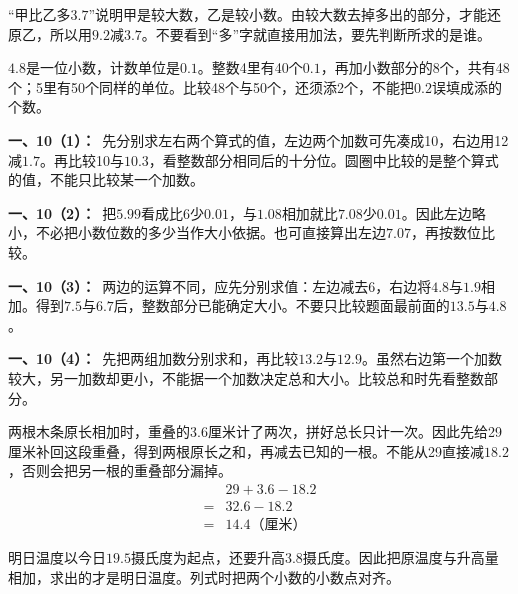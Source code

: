 \documentclass[multi=snippet,border=0pt]{standalone}
\newenvironment{snippet}[3]{\begin{minipage}{#1bp}\color{answerred}\fontsize{#2}{#3}\selectfont\raggedright}{\end{minipage}}
\begin{document}
\begin{snippet}{505}{11.5}{14}“甲比乙多\(3.7\)”说明甲是较大数，乙是较小数。由较大数去掉多出的部分，才能还原乙，所以用\(9.2\)减\(3.7\)。不要看到“多”字就直接用加法，要先判断所求的是谁。\end{snippet}
\begin{snippet}{505}{11.5}{14}\(4.8\)是一位小数，计数单位是\(0.1\)。整数4里有40个\(0.1\)，再加小数部分的8个，共有48个；5里有50个同样的单位。比较48个与50个，还须添2个，不能把\(0.2\)误填成添的个数。\end{snippet}
\begin{snippet}{505}{11.5}{14}\textbf{一、10（1）：}\ 先分别求左右两个算式的值，左边两个加数可先凑成10，右边用12减\(1.7\)。再比较10与\(10.3\)，看整数部分相同后的十分位。圆圈中比较的是整个算式的值，不能只比较某一个加数。\end{snippet}
\begin{snippet}{505}{11.5}{14}\textbf{一、10（2）：}\ 把\(5.99\)看成比6少\(0.01\)，与\(1.08\)相加就比\(7.08\)少\(0.01\)。因此左边略小，不必把小数位数的多少当作大小依据。也可直接算出左边\(7.07\)，再按数位比较。\end{snippet}
\begin{snippet}{505}{11.5}{14}\textbf{一、10（3）：}\ 两边的运算不同，应先分别求值：左边减去6，右边将\(4.8\)与\(1.9\)相加。得到\(7.5\)与\(6.7\)后，整数部分已能确定大小。不要只比较题面最前面的\(13.5\)与\(4.8\)。\end{snippet}
\begin{snippet}{505}{11.5}{14}\textbf{一、10（4）：}\ 先把两组加数分别求和，再比较\(13.2\)与\(12.9\)。虽然右边第一个加数较大，另一加数却更小，不能据一个加数决定总和大小。比较总和时先看整数部分。\end{snippet}
\begin{snippet}{505}{11.5}{14}两根木条原长相加时，重叠的\(3.6\)厘米计了两次，拼好总长只计一次。因此先给29厘米补回这段重叠，得到两根原长之和，再减去已知的一根。不能从29直接减\(18.2\)，否则会把另一根的重叠部分漏掉。\[\begin{aligned}&29+3.6-18.2\\={}&32.6-18.2\\={}&14.4\text{（厘米）}\end{aligned}\]\end{snippet}
\begin{snippet}{505}{11.5}{14}明日温度以今日\(19.5\)摄氏度为起点，还要升高\(3.8\)摄氏度。因此把原温度与升高量相加，求出的才是明日温度。列式时把两个小数的小数点对齐。\end{snippet}
\end{document}
